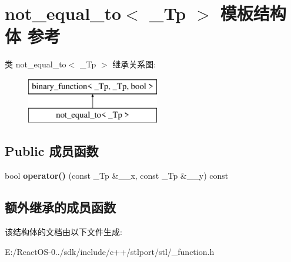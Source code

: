 \hypertarget{structnot__equal__to}{}\section{not\+\_\+equal\+\_\+to$<$ \+\_\+\+Tp $>$ 模板结构体 参考}
\label{structnot__equal__to}
类 not\+\_\+equal\+\_\+to$<$ \+\_\+\+Tp $>$ 继承关系图\+:\begin{figure}[H]
\begin{center}
\leavevmode
\includegraphics[height=2.000000cm]{structnot__equal__to}
\end{center}
\end{figure}
\subsection*{Public 成员函数}
\begin{DoxyCompactItemize}
\item 
\mbox{\label{structnot__equal__to_a357d070167e94203a302236e0d38d141}} 
bool {\bfseries operator()} (const \+\_\+\+Tp \&\+\_\+\+\_\+x, const \+\_\+\+Tp \&\+\_\+\+\_\+y) const
\end{DoxyCompactItemize}
\subsection*{额外继承的成员函数}


该结构体的文档由以下文件生成\+:\begin{DoxyCompactItemize}
\item 
E\+:/\+React\+O\+S-\/0../sdk/include/c++/stlport/stl/\+\_\+function.\+h\end{DoxyCompactItemize}
